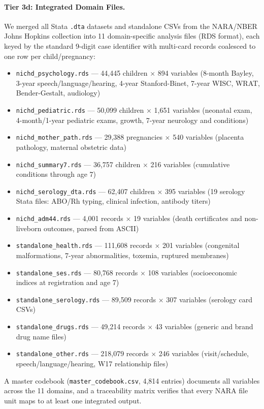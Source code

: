\documentclass[12pt]{article}
\begin{document}
\paragraph{Tier 3d: Integrated Domain Files.}
We merged all Stata \texttt{.dta} datasets and standalone CSVs from the NARA/NBER Johns Hopkins collection into 11 domain-specific analysis files (RDS format), each keyed by the standard 9-digit case identifier with multi-card records coalesced to one row per child/pregnancy:
\begin{itemize}
\setlength{\itemsep}{2pt}
    \item \texttt{nichd\_psychology.rds} --- 44,445 children $\times$ 894 variables (8-month Bayley, 3-year speech/language/hearing, 4-year Stanford-Binet, 7-year WISC, WRAT, Bender-Gestalt, audiology)
    \item \texttt{nichd\_pediatric.rds} --- 50,099 children $\times$ 1,651 variables (neonatal exam, 4-month/1-year pediatric exams, growth, 7-year neurology and conditions)
    \item \texttt{nichd\_mother\_path.rds} --- 29,388 pregnancies $\times$ 540 variables (placenta pathology, maternal obstetric data)
    \item \texttt{nichd\_summary7.rds} --- 36,757 children $\times$ 216 variables (cumulative conditions through age 7)
    \item \texttt{nichd\_serology\_dta.rds} --- 62,407 children $\times$ 395 variables (19 serology Stata files: ABO/Rh typing, clinical infection, antibody titers)
    \item \texttt{nichd\_adm44.rds} --- 4,001 records $\times$ 19 variables (death certificates and non-liveborn outcomes, parsed from ASCII)
    \item \texttt{standalone\_health.rds} --- 111,608 records $\times$ 201 variables (congenital malformations, 7-year abnormalities, toxemia, ruptured membranes)
    \item \texttt{standalone\_ses.rds} --- 80,768 records $\times$ 108 variables (socioeconomic indices at registration and age 7)
    \item \texttt{standalone\_serology.rds} --- 89,509 records $\times$ 307 variables (serology card CSVs)
    \item \texttt{standalone\_drugs.rds} --- 49,214 records $\times$ 43 variables (generic and brand drug name files)
    \item \texttt{standalone\_other.rds} --- 218,079 records $\times$ 246 variables (visit/\allowbreak schedule, speech/\allowbreak language/\allowbreak hearing, W17 relationship files)
\end{itemize}
A master codebook (\texttt{master\_codebook.csv}, 4,814 entries) documents all variables across the 11 domains, and a traceability matrix verifies that every NARA file unit maps to at least one integrated output.
\end{document}
